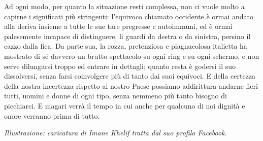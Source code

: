 \documentclass[
  letterpaper,
  DIV=11,
  numbers=noendperiod]{scrartcl}
\begin{document}
Ad ogni modo, per quanto la situazione resti complessa, non ci vuole
molto a capirne i significati più stringenti: l'equivoco chiamato
occidente è ormai andato alla deriva insieme a tutte le sue tare
pregresse e autoimmuni, ed è ormai palesemente incapace di distinguere,
li guardi da destra o da sinistra, persino il cazzo dalla fica. Da parte
sua, la rozza, pretenziosa e piagnucolosa italietta ha mostrato di sé
davvero un brutto spettacolo su ogni ring e su ogni schermo, e non serve
dilungarsi troppo ed entrare in dettagli; quanto resta è godersi il suo
dissolversi, senza farsi coinvolgere più di tanto dai suoi equivoci. E
della certezza della nostra incertezza rispetto al nostro Paese possiamo
addirittura andarne fieri tutti, uomini e donne di ogni tipo, senza
nemmeno più tanto bisogno di picchiarci. E magari verrà il tempo in cui
anche per qualcuno di noi dignità e onore verranno prima di tutto.

\emph{Illustrazione: caricatura di Imane Khelif tratta dal suo profilo
Facebook.}
\end{document}
